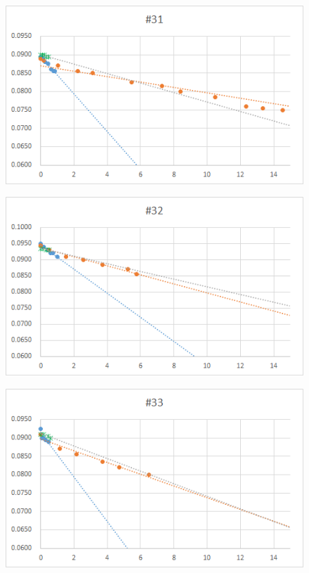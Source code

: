 \documentclass[12pt,a4paper]{jarticle}
\begin{document}
\begin{figure}[htbp]
  \centering
     \includegraphics[width=120mm]{vol_031.png}
\end{figure}
\begin{figure}[htbp]
  \centering
     \includegraphics[width=120mm]{vol_032.png}
\end{figure}
\begin{figure}[htbp]
  \centering
     \includegraphics[width=120mm]{vol_033.png}
\end{figure}
\end{document}
